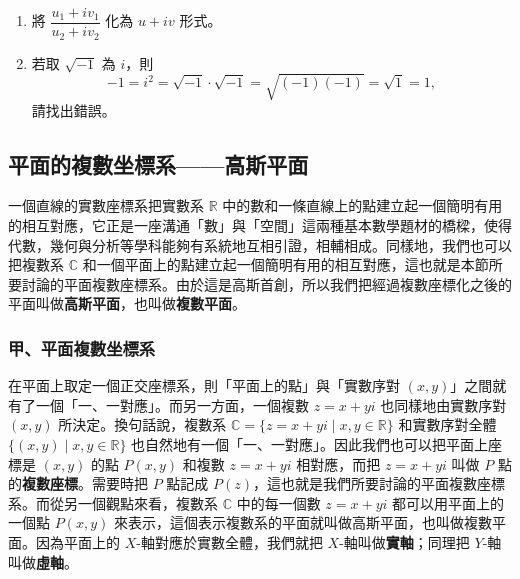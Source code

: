 \begin{enumerate}
  \begin{enumerate}[(i)]
  \end{enumerate}
  \item 將 $\dfrac{u_1+iv_1}{u_2+iv_2}$ 化為 $u+iv$ 形式。
  \item 若取 $\sqrt{-1}$ 為 $i$，則
  \[
  -1 = i^2 = \sqrt{-1}\cdot\sqrt{-1} = \sqrt{(-1)(-1)} = \sqrt{1} = 1,
  \]
  請找出錯誤。
\end{enumerate}


\subsection{平面的複數坐標系——高斯平面}\label{sec:b4s-5-2}

一個直線的實數座標系把實數系 $\mathbb{R}$ 中的數和一條直線上的點建立起一個簡明有用的相互對應，它正是一座溝通「數」與「空間」這兩種基本數學題材的橋樑，使得代數，幾何與分析等學科能夠有系統地互相引證，相輔相成。同樣地，我們也可以把複數系 $\mathbb{C}$ 和一個平面上的點建立起一個簡明有用的相互對應，這也就是本節所要討論的平面複數座標系。由於這是高斯首創，所以我們把經過複數座標化之後的平面叫做\textbf{高斯平面}，也叫做\textbf{複數平面}。

\subsubsection*{甲、平面複數坐標系}

在平面上取定一個正交座標系，則「平面上的點」與「實數序對 $(x, y)$」之間就有了一個「一、一對應」。而另一方面，一個複數 $z = x+yi$ 也同樣地由實數序對 $(x, y)$ 所決定。換句話說，複數系 $\mathbb{C} = \{z=x+yi \mid x, y \in \mathbb{R}\}$ 和實數序對全體 $\{(x, y) \mid x, y \in \mathbb{R}\}$ 也自然地有一個「一、一對應」。因此我們也可以把平面上座標是 $(x, y)$ 的點 $P(x, y)$ 和複數 $z = x+yi$ 相對應，而把 $z = x+yi$ 叫做 $P$ 點的\textbf{複數座標}。需要時把 $P$ 點記成 $P(z)$，這也就是我們所要討論的平面複數座標系。而從另一個觀點來看，複數系 $\mathbb{C}$ 中的每一個數 $z = x+yi$ 都可以用平面上的一個點 $P(x, y)$ 來表示，這個表示複數系的平面就叫做高斯平面，也叫做複數平面。因為平面上的 $X$-軸對應於實數全體，我們就把 $X$-軸叫做\textbf{實軸}；同理把 $Y$-軸叫做\textbf{虛軸}。

